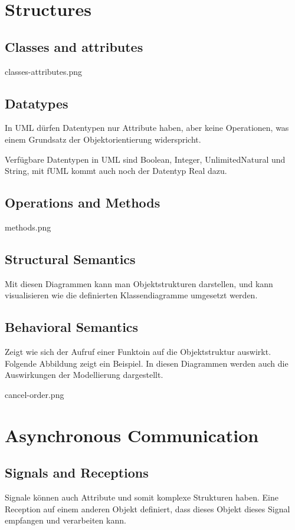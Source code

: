 \section{Structures}

\subsection{Classes and attributes}
classes-attributes.png

\subsection{Datatypes}
In UML dürfen Datentypen nur Attribute haben, aber keine Operationen, was einem Grundsatz der Objektorientierung widerspricht.

Verfügbare Datentypen in UML sind Boolean, Integer, UnlimitedNatural und String, mit fUML kommt auch noch der Datentyp Real dazu.

\subsection{Operations and Methods}
methods.png

\subsection{Structural Semantics}
Mit diesen Diagrammen kann man Objektstrukturen darstellen, und kann visualisieren wie die definierten Klassendiagramme umgesetzt werden.

\subsection {Behavioral Semantics}
Zeigt wie sich der Aufruf einer Funktoin auf die Objektstruktur auswirkt. Folgende Abbildung zeigt ein Beispiel. In diesen Diagrammen werden auch die Auswirkungen der Modellierung dargestellt.

cancel-order.png

\section{Asynchronous Communication}

\subsection{Signals and Receptions}
Signale können auch Attribute und somit komplexe Strukturen haben. Eine Reception auf einem anderen Objekt definiert, dass dieses Objekt dieses Signal empfangen und verarbeiten kann.


